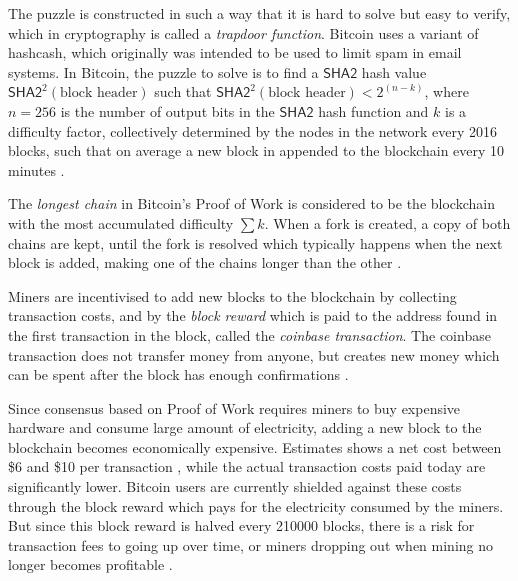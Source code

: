 \documentclass{style/kththesis}
\begin{document}
The puzzle is constructed in such a way that it is hard to solve but easy to verify, which in cryptography is called a \emph{trapdoor function}. Bitcoin uses a variant of hashcash, which originally was intended to be used to limit spam in email systems. In Bitcoin, the puzzle to solve is to find a $\mathsf{SHA2}$ hash value $\mathsf{SHA2}^2(\text{block header})$ such that $\mathsf{SHA2}^2(\text{block header}) < 2^{(n - k)}$, where $n = 256$ is the number of output bits in the $\mathsf{SHA2}$ hash function and $k$ is a difficulty factor, collectively determined by the nodes in the network every 2016 blocks, such that on average a new block in appended to the blockchain every 10 minutes \cite{Antonopoulos14}.

The \emph{longest chain} in Bitcoin's Proof of Work is considered to be the blockchain with the most accumulated difficulty $\sum{k}$. When a fork is created, a copy of both chains are kept, until the fork is resolved which typically happens when the next block is added, making one of the chains longer than the other \cite{Antonopoulos14}.

Miners are incentivised to add new blocks to the blockchain by collecting transaction costs, and by the \emph{block reward} which is paid to the address found in the first transaction in the block, called the \emph{coinbase transaction}. The coinbase transaction does not transfer money from anyone, but creates new money which can be spent after the block has enough confirmations \cite{Antonopoulos14}.

Since consensus based on Proof of Work requires miners to buy expensive hardware and consume large amount of electricity, adding a new block to the blockchain becomes economically expensive. Estimates shows a net cost between \$6 and \$10 per transaction \cite{Davarpanah15, Croman16}, while the actual transaction costs paid today are significantly lower. Bitcoin users are currently shielded against these costs through the block reward which pays for the electricity consumed by the miners. But since this block reward is halved every 210000 blocks, there is a risk for transaction fees to going up over time, or miners dropping out when mining no longer becomes profitable \cite{Kaskaloglu14}.
\end{document}

